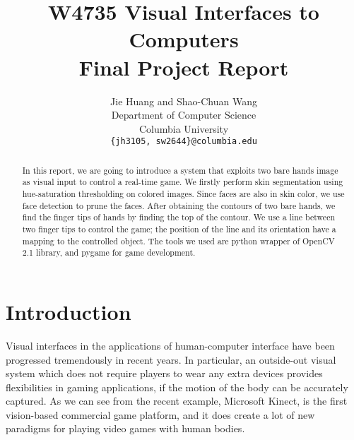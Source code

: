 \documentclass[10pt,twocolumn,letterpaper]{article}
\begin{document}
\title{W4735 Visual Interfaces to Computers\\Final Project Report}
\author{Jie Huang and Shao-Chuan Wang\\
Department of Computer Science\\
Columbia University\\
{\tt\small \{jh3105, sw2644\}@columbia.edu}
}

\maketitle
\thispagestyle{empty}

\begin{abstract}
In this report, we are going to introduce a system that exploits two bare hands image 
as visual input to control a real-time game. We firstly perform skin segmentation using hue-saturation 
thresholding on colored images. Since faces are also in skin color, we 
use face detection to prune the faces. After obtaining the contours of two 
bare hands, we find the finger tips of hands by finding the top of the contour.
We use a line between two finger tips to control the game; the position of the line 
and its orientation have a mapping to the controlled object. The tools we used are python wrapper 
of OpenCV 2.1 library, and pygame for game development.
\end{abstract}


\section{Introduction}

Visual interfaces in the applications of human-computer interface 
have been progressed tremendously in recent years. In particular, an outside-out 
visual system \cite{outout} which does not require players to wear 
any extra devices provides flexibilities in gaming applications, if 
the motion of the body can be accurately captured.
As we can see from the recent example, Microsoft Kinect, is the 
first vision-based commercial game platform, and it does 
create a lot of new paradigms for playing video games with human bodies. 
\end{document}

